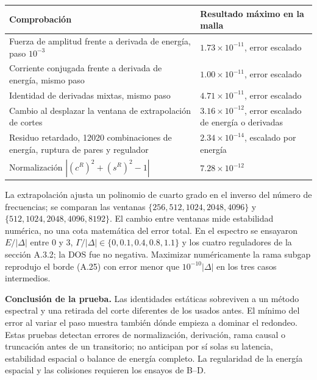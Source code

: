 \documentclass[
  spanish,
  10pt,
  a4paper,
]{article}
\newcounter{none} %
\begin{document}
{\def\LTcaptype{none} %
\begin{longtable}[]{@{}
  >{\raggedright\arraybackslash}p{}
  >{\raggedright\arraybackslash}p{}@{}}
\toprule\noalign{}
\begin{minipage}[b]{\linewidth}\raggedright
Comprobación
\end{minipage} & \begin{minipage}[b]{\linewidth}\raggedright
Resultado máximo en la malla
\end{minipage} \\
\midrule\noalign{}
\endhead
\bottomrule\noalign{}
\endlastfoot
Fuerza de amplitud frente a derivada de energía, paso \(10^{-3}\) &
\(1.73\times10^{-11}\), error escalado \\
Corriente conjugada frente a derivada de energía, mismo paso &
\(1.00\times10^{-11}\), error escalado \\
Identidad de derivadas mixtas, mismo paso & \(4.71\times10^{-11}\),
error escalado \\
Cambio al desplazar la ventana de extrapolación de cortes &
\(3.16\times10^{-12}\), error escalado de energía o derivadas \\
Residuo retardado, 12020 combinaciones de energía, ruptura de pares y
regulador & \(2.34\times10^{-14}\), escalado por energía \\
Normalización \(|(c^R)^2+(s^R)^2-1|\) & \(7.28\times10^{-12}\) \\
\end{longtable}
}

La extrapolación ajusta un polinomio de cuarto grado en el inverso del
número de frecuencias; se comparan las ventanas
\(\{256,512,1024,2048,4096\}\) y \(\{512,1024,2048,4096,8192\}\). El
cambio entre ventanas mide estabilidad numérica, no una cota matemática
del error total. En el espectro se ensayaron \(E/|\Delta|\) entre 0 y 3,
\(\Gamma/|\Delta|\in\{0,0.1,0.4,0.8,1.1\}\) y los cuatro reguladores de
la sección A.3.2; la DOS fue no negativa. Maximizar numéricamente la
rama subgap reprodujo el borde (A.25) con error menor que
\(10^{-10}|\Delta|\) en los tres casos intermedios.

\textbf{Conclusión de la prueba.} Las identidades estáticas sobreviven a
un método espectral y una retirada del corte diferentes de los usados
antes. El mínimo del error al variar el paso muestra también dónde
empieza a dominar el redondeo. Estas pruebas detectan errores de
normalización, derivación, rama causal o truncación antes de un
transitorio; no anticipan por sí solas su latencia, estabilidad espacial
o balance de energía completo. La regularidad de la energía espacial y
las colisiones requieren los ensayos de B--D.
\end{document}
